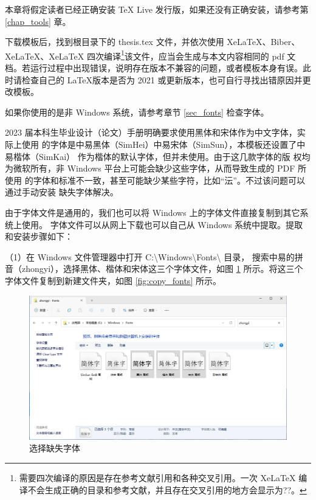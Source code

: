 \newcommand{\filename}[1]{\colorbox[RGB]{222,222,222}{\mbox{#1}}}
\newcommand{\hltext}[1]{\colorbox[RGB]{237,250,0}{#1}}  %

\label{chap:模板使用说明}
本章将假定读者已经正确安装 \TeX{} Live 发行版，如果还没有正确安装，请参考第 \ref{chap_tools} 章。

\label{sec_check}  %
下载模板后，找到根目录下的 \filename{thesis.tex} 文件，并依次使用 XeLaTeX、Biber、XeLaTeX、XeLaTeX 四次编译\footnote{需要四次编译的原因是存在参考文献引用和各种交叉引用。一次 XeLaTeX 编译不会生成正确的目录和参考文献，并且存在交叉引用的地方会显示为??。}该文件，应当会生成与本文内容相同的 pdf 文档。若运行过程中出现错误，说明存在版本不兼容的问题，或者模板本身有误。此时请检查自己的 \LaTeX 版本是否为 2021 或更新版本，也可自行寻找出错原因并更改模板。

如果你使用的是非 Windows 系统，请参考章节 \ref{sec_fonts} 检查字体。

\label{sec_fonts}
2023 届本科生毕业设计（论文）手册明确要求使用黑体和宋体作为中文字体，实际上使用
的字体是中易黑体（SimHei）中易宋体（SimSun），本模板还设置了中易楷体（SimKai）
作为楷体的默认字体，但并未使用\cite{ref:thesis_manual_2023}。由于这几款字体的版
权均为微软所有，非 Windows 平台上可能会缺少这些字体，从而导致生成的 PDF 所使用
的字体和标准不一致，甚至可能缺少某些字符，比如“沄”。不过该问题可以通过手动安装
缺失字体解决。

由于字体文件是通用的，我们也可以将 Windows 上的字体文件直接复制到其它系统上使用。
字体文件可以从网上下载也可以自己从 Windows 系统中提取。提取和安装步骤如下：

（1）在 Windows 文件管理器中打开
\filename{C:\textbackslash{Windows}\textbackslash{Fonts}\textbackslash} 目录，
搜索中易的拼音（zhongyi），选择黑体、楷体和宋体这三个字体文件，如图
\ref{fig:select_fonts} 所示。将这三个字体文件复制到新建文件夹，如图
\ref{fig:copy_fonts} 所示。

\begin{figure}[htbp]
	\centering
	\includegraphics[width=\linewidth]{figure/thesis/select_fonts.png}
	\caption{选择缺失字体}
	\label{fig:select_fonts}
\end{figure}

